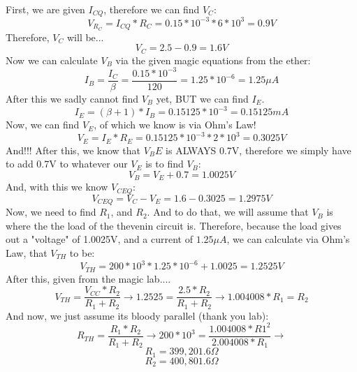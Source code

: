 \documentclass{article}
\begin{document}
First, we are given $I_{CQ}$, therefore we can find $V_C$:
$$ V_{R_C} = I_{CQ}*R_C = 0.15*10^{-3}*6*10^{3} = 0.9V $$
Therefore, $V_C$ will be...
$$ V_C = 2.5 - 0.9 = 1.6V $$
Now we can calculate $V_B$ via the given magic equations from the ether:
$$ I_B = \frac{I_C}{\beta} = \frac{0.15*10^{-3}}{120} = 1.25*10^{-6} = 1.25\mu A $$
After this we sadly cannot find $V_B$ yet, BUT we can find $I_E$.
$$ I_E = (\beta + 1)*I_B = 0.15125*10^{-3} = 0.15125mA $$
Now, we can find $V_E$, of which we know is via Ohm's Law!
$$ V_E = I_E * R_E = 0.15125*10^{-3} * 2*10^{3} = 0.3025V $$
And!!! After this, we know that $V_BE$ is ALWAYS 0.7V, therefore we simply have to add 0.7V to whatever our $V_E$ is to find $V_B$:
$$ V_B = V_E + 0.7 = 1.0025V $$
And, with this we know $V_{CEQ}$:
$$ V_{CEQ} = V_C - V_E = 1.6 - 0.3025 = 1.2975V $$
Now, we need to find $R_1$, and $R_2$. And to do that, we will assume that $V_B$ is where the the load of the thevenin circuit is. Therefore, because the load gives out a "voltage" of 1.0025V, and a current of $1.25\mu A$, we can calculate via Ohm's Law, that $V_{TH}$ to be:
$$ V_{TH} = 200*10^{3}*1.25*10^{-6} + 1.0025 = 1.2525V $$
After this, given from the magic lab.... 
$$ V_{TH} = \frac{V_{CC}*R_2}{R_1 + R_2} \rightarrow 1.2525 = \frac{2.5*R_2}{R_1 + R_2} \rightarrow 1.004008*R_1 = R_2 $$
And now, we just assume its bloody parallel (thank you lab):
$$ R_{TH} = \frac{R_1*R_2}{R_1 + R_2} \rightarrow 200*10^3 = \frac{1.004008*R1^2}{2.004008*R_1} \rightarrow $$
$$ R_1 = 399,201.6\Omega $$
$$ R_2 = 400,801.6\Omega $$
\end{document}
